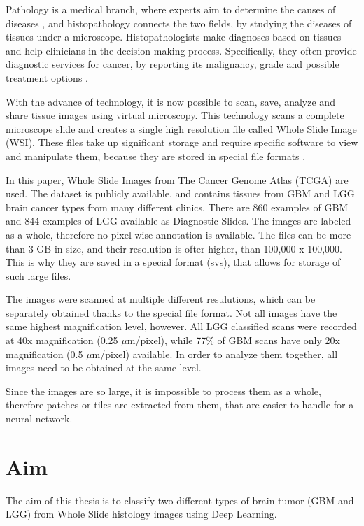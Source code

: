 Pathology is a medical branch, where experts aim to determine the causes of diseases \cite{pathology_def}, and histopathology connects the two fields, by studying the diseases of tissues under a microscope. Histopathologists make diagnoses based on tissues and help clinicians in the decision making process. Specifically, they often provide diagnostic services for cancer, by reporting its malignancy, grade and possible treatment options \cite{histopathology_def}.

With the advance of technology, it is now possible to scan, save, analyze and share tissue images using virtual microscopy. This technology scans a complete microscope slide and creates a single high resolution file called Whole Slide Image (WSI). These files take up significant storage and require specific software to view and manipulate them, because they are stored in special file formats \cite{wsi_def}.

In this paper, Whole Slide Images from The Cancer Genome Atlas (TCGA) are used. The dataset is publicly available, and contains tissues from GBM and LGG brain cancer types from many different clinics. There are 860 examples of GBM and 844 examples of LGG available as Diagnostic Slides. The images are labeled as a whole, therefore no pixel-wise annotation is available. The files can be more than 3 GB in size, and their resolution is ofter higher, than 100,000 x 100,000. This is why they are saved in a special format (svs), that allows for storage of such large files.

The images were scanned at multiple different resulutions, which can be separately obtained thanks to the special file format. Not all images have the same highest magnification level, however. All LGG classified scans were recorded at 40x magnification (0.25 $\mu$m/pixel), while 77\% of GBM scans have only 20x magnification (0.5 $\mu$m/pixel) available. In order to analyze them together, all images need to be obtained at the same level.

Since the images are so large, it is impossible to process them as a whole, therefore patches or tiles are extracted from them, that are easier to handle for a neural network.

\section{Aim}
\label{sec:aim}


The aim of this thesis is to classify two different types of brain tumor (GBM and LGG) from Whole Slide histology images using Deep Learning. 

